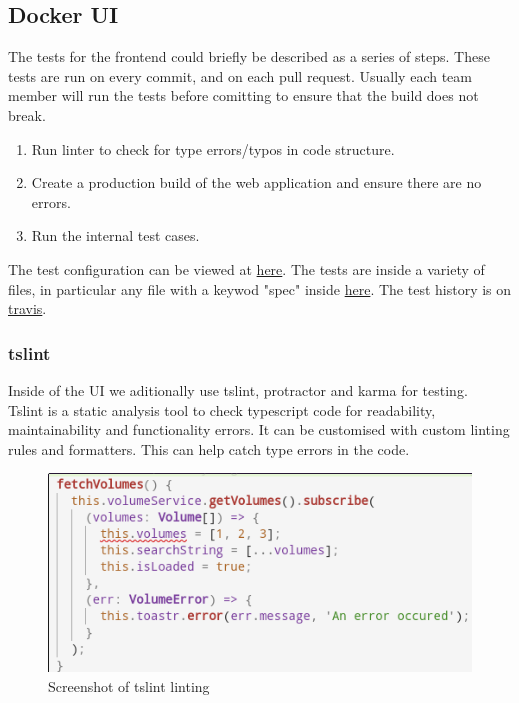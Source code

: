 \documentclass[]{article}
\begin{document}
\subsection{Docker UI}
The tests for the frontend could briefly be described as a series of steps.
These tests are run on every commit, and on each pull request. Usually each team
member will run the tests before comitting to ensure that the build does not break.

\begin{enumerate}
	\item Run linter to check for type errors/typos in code structure.
	\item Create a production build of the web application and ensure there are no errors.
	\item Run the internal test cases.
\end{enumerate}

The test configuration can be viewed at \href{https://github.com/TripleParity/docker-ui/blob/master/karma.conf.js}{here}.
The tests are inside a variety of files, in particular any file with a keywod "spec" inside \href{https://github.com/TripleParity/docker-ui/tree/master/src/app}{here}.
The test history is on \href{https://travis-ci.org/TripleParity/docker-ui}{travis}.

\subsubsection{tslint}
Inside of the UI we aditionally use tslint, protractor and karma for testing.
\\
Tslint is a static analysis tool to check typescript code for readability, maintainability and functionality errors.
It can be customised with custom linting rules and formatters.
This can help catch type errors in the code.
\begin{figure}[H]
	\centering
	\includegraphics[scale=0.5]{tslint_error.png}
	\caption{Screenshot of tslint linting}
\end{figure}
\end{document}
